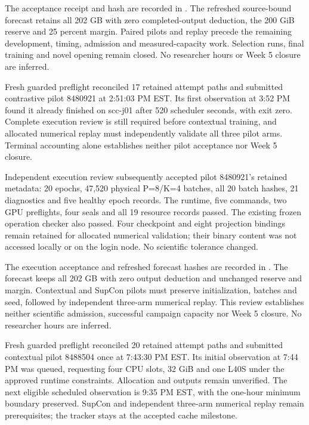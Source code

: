 The acceptance receipt and hash are recorded in
. The refreshed source-bound forecast
retains all 202 GB with zero completed-output deduction, the 200 GiB reserve
and 25 percent margin. Paired pilots and replay precede the remaining development,
timing, admission and measured-capacity work. Selection runs, final training and
novel opening remain closed. No researcher hours or Week 5 closure are inferred.

Fresh guarded preflight reconciled 17 retained attempt paths and submitted
contrastive pilot 8480921 at 2:51:03 PM EST. Its first observation at 3:52 PM
found it already finished on scc-j01 after 520 scheduler seconds, with exit zero.
Complete execution review is still required before contextual training, and
allocated numerical replay must independently validate all three pilot arms.
Terminal accounting alone establishes neither pilot acceptance nor Week 5 closure.


Independent execution review subsequently accepted pilot 8480921's retained
metadata: 20 epochs, 47,520 physical P=8/K=4 batches, all 20 batch hashes,
21 diagnostics and five healthy epoch records. The runtime, five commands,
two GPU preflights, four seals and all 19 resource records passed. The existing
frozen operation checker also passed. Four checkpoint and eight projection
bindings remain retained for allocated numerical validation; their binary content
was not accessed locally or on the login node. No scientific tolerance changed.

The execution acceptance and refreshed forecast hashes are recorded in
. The forecast keeps all 202 GB with
zero output deduction and unchanged reserve and margin. Contextual and SupCon
pilots must preserve initialization, batches and seed, followed by independent
three-arm numerical replay. This review establishes neither scientific admission,
successful campaign capacity nor Week 5 closure. No researcher hours are inferred.

Fresh guarded preflight reconciled 20 retained attempt paths and submitted
contextual pilot 8488504 once at 7:43:30 PM EST. Its initial observation at
7:44 PM was queued, requesting four CPU slots, 32 GiB and one L40S under the
approved runtime constraints. Allocation and outputs remain unverified.
The next eligible scheduled observation is 9:35 PM EST, with the one-hour
minimum boundary preserved. SupCon and independent three-arm numerical replay
remain prerequisites; the tracker stays at the accepted cache milestone.

